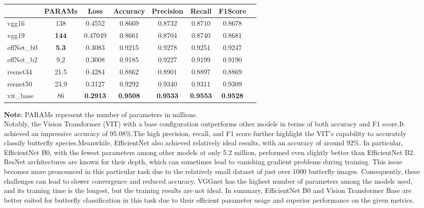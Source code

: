 \documentclass[10pt,twocolumn,letterpaper]{article}
\begin{document}
\begin{table}[h]
    \small
    \setlength{\tabcolsep}{3.5pt}
    \begin{tabular}{@{}lccccccc@{}}
        \toprule
        & PARAMs & Loss & Accuracy & Precision & Recall & F1Score \\
        \midrule
        vgg16 & 138 & 0.4552 & 0.8669 & 0.8732 & 0.8710 & 0.8678 \\
        vgg19 & \color{red}\textbf{144} & 0.47049 & 0.8661 & 0.8704 & 0.8740 & 0.8681\\
        effNet\_b0 & \color{green}\textbf{5.3} & 0.3083 & 0.9215 & 0.9278 & 0.9251 & 0.9247 \\
        effNet\_b2 & 9.2 & 0.3008 & 0.9185 & 0.9227 & 0.9199 & 0.9190 \\
        resnet34 & 21.5 & 0.4284 & 0.8862 & 0.8901 & 0.8897 & 0.8869 \\
        resnet50 & 23.9 & 0.3127 & 0.9292 & 0.9340 & 0.9311 & 0.9309 \\
        vit\_base & 86 & \textbf{0.2913} & \textbf{0.9508} & \textbf{0.9533} & \textbf{0.9553} & \textbf{0.9528} \\
        \bottomrule
    \end{tabular}
\end{table}

\textbf{Note}: PARAMs represent the number of parameters in millions.\\


Notably, the Vision Transformer (VIT) with a base configuration outperforms other models in terms of both accuracy and F1 score.It achieved an impressive accuracy of 95.08\%.The high precision, recall, and F1 score further highlight the VIT's capability to accurately classify butterfly species.Meanwhile, EfficientNet also achieved relatively ideal results, with an accuracy of around 92\%. In particular, EfficientNet B0, with the fewest parameters among other models at only 5.2 million, performed even slightly better than EfficientNet B2. ResNet architectures are known for their depth, which can sometimes lead to vanishing gradient problems during training. This issue becomes more pronounced in this particular task due to the relatively small dataset of just over 1000 butterfly images. Consequently, these challenges can lead to slower convergence and reduced accuracy. VGGnet has the highest number of parameters among the models used, and its training time is the longest, but the training results are not ideal. In summary, EfficientNet B0 and Vision Transformer Base are better suited for butterfly classification in this task due to their efficient parameter usage and superior performance on the given metrics.
\end{document}

